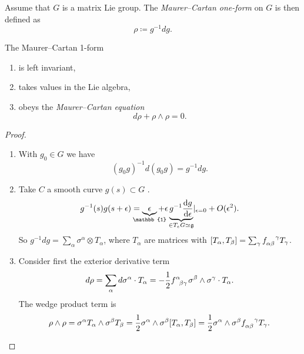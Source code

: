 \begin{definition}
  Assume that $G$ is a matrix Lie group. The \emph{Maurer--Cartan one-form} on $G$ is then defined as
  \begin{equation}
    \rho \coloneqq g^{-1} d g.
  \end{equation}
\end{definition}
\begin{claim}
  The Maurer--Cartan 1-form
  \begin{enumerate}
    \item is left invariant,
    \item takes values in the Lie algebra,
    \item obeys the \emph{Maurer--Cartan equation}
      \begin{equation}
	d\rho + \rho \wedge \rho = 0.
      \end{equation}
  \end{enumerate}
\end{claim}
\begin{proof}
  \begin{enumerate}
    \item With $g_0 \in G$ we have
      \begin{equation}
	(g_0 g)^{-1} d(g_0 g) = g^{-1} dg.
      \end{equation}
    \item Take $C$  a smooth curve $g(s) \subset G$ .
    \begin{equation}
      g^{-1}(s) g(s + \epsilon) = \underbrace{\epsilon}_{\mathclap{\mathbb{1}}} + \epsilon \underbrace{g^{-1} \dv{g}{\epsilon}}_{\mathclap{\in T_e G \simeq \mathfrak{g}}} \rvert_{\epsilon = 0} + O(\epsilon^2).
    \end{equation}
    So $g^{-1} d g = \sum_\alpha \sigma^{\alpha} \otimes T_\alpha$, where $T_\alpha$ are matrices with $[T_\alpha, T_\beta] = \sum_\gamma f\indices{_{\alpha\beta}^\gamma} T_{\gamma}$.
    \item Consider first the exterior derivative term
      \begin{equation}
	d \rho = \sum_\alpha d\sigma^{\alpha} \cdot T_{\alpha} = -\frac{1}{2} f\indices{^{\alpha}_{\beta\gamma}} \sigma^{\beta} \wedge \sigma^{\gamma} \cdot T_{\alpha}.
      \end{equation}
      The wedge product term is
      \begin{equation}
	\rho \wedge \rho = \sigma^{\alpha} T_{\alpha} \wedge \sigma^{\beta} T_{\beta} = \frac{1}{2} \sigma^{\alpha} \wedge \sigma^{\beta} [T_{\alpha}, T_{\beta}]
	= \frac{1}{2} \sigma^{\alpha} \wedge \sigma^{\beta} f\indices{_{\alpha\beta}^{\gamma}} T_{\gamma}.
      \end{equation}
  \end{enumerate}
\end{proof}
